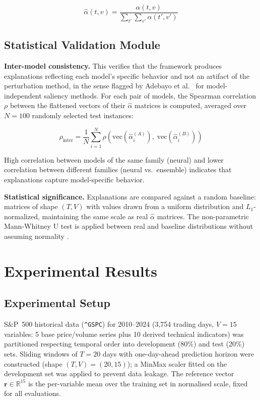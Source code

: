 \documentclass[runningheads]{llncs}
\begin{document}
\begin{equation}
    \hat{\alpha}(t, v) = \frac{\alpha(t, v)}
    {\sum_{t'}\sum_{v'} \alpha(t', v')}
\end{equation}

\subsection{Statistical Validation Module}

\textbf{Inter-model consistency.}
This verifies that the framework produces explanations reflecting
each model's specific behavior and not an artifact of the
perturbation method, in the sense flagged by Adebayo et
al.~\cite{adebayo2018} for model-independent saliency methods. For
each pair of models, the Spearman correlation $\rho$ between the
flattened vectors of their $\hat{\alpha}$ matrices is computed,
averaged over $N=100$ randomly selected test instances:

\begin{equation}
    \rho_{\text{inter}} = \frac{1}{N} \sum_{i=1}^{N}
    \rho\!\left(
    \text{vec}(\hat{\alpha}_i^{(A)}),\;
    \text{vec}(\hat{\alpha}_i^{(B)})
    \right)
\end{equation}

High correlation between models of the same family (neural) and
lower correlation between different families (neural vs.\ ensemble)
indicates that explanations capture model-specific behavior.

\textbf{Statistical significance.}
Explanations are compared against a random baseline: matrices of
shape $(T, V)$ with values drawn from a uniform distribution and
$L_1$-normalized, maintaining the same scale as real $\hat{\alpha}$
matrices. The non-parametric Mann-Whitney U test is applied between
real and baseline distributions without assuming normality
\cite{schlegel2019}.

\section{Experimental Results}
\label{sec:results}

\subsection{Experimental Setup}

S\&P~500 historical data (\texttt{\^{}GSPC}) for 2010--2024
(3,754 trading days, $V{=}15$ variables: 5 base price/volume series
plus 10 derived technical indicators) was partitioned respecting
temporal order into development (80\%) and test (20\%) sets.
Sliding windows of $T{=}20$ days with one-day-ahead prediction
horizon were constructed (shape $(T,V){=}(20,15)$); a MinMax scaler
fitted on the development set was applied to prevent data leakage.
The reference vector $\mathbf{r}{\in}\mathbb{R}^{15}$ is the
per-variable mean over the training set in normalised scale,
fixed for all evaluations.
\end{document}
